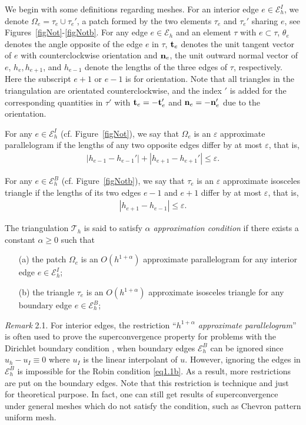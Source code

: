 \documentclass[leqno,final]{siamltex}
\numberwithin{equation}{section}
\newcommand{\abs}[1]{\left\vert#1\right\vert}
\newcommand{\al}{\alpha}
\newcommand{\ep}{\varepsilon}
\newcommand{\Om}{\Omega}
\newcommand{\ta}{\theta}
\newcommand{\bt}{{\rm\mathbf t}}
\newcommand{\bn}{{\rm\mathbf n}}
\newcommand{\T}{\mathcal{T}}
\newcommand{\E}{\mathcal{E}}
\newcommand{\eqn}[1]{\begin{align*}#1\end{align*}}
\begin{document}
We begin with some definitions regarding meshes.
For an interior edge $e\in\E_h^I$, we denote $\Om_e=\tau_e\cup\tau_e'$,
a patch formed by the two elements $\tau_e$ and $\tau_e'$ sharing $e$, see Figures~\ref{figNot}-\ref{figNotb}.
For any edge $e\in\E_h$ and an element $\tau$ {with} $e\subset\tau$,
$\ta_e$ denotes the angle opposite of the edge $e$ in $\tau${,
$\bt_e$ denotes the unit tangent vector of $e$ with counterclockwise orientation and $\bn_e$, the unit outward normal vector of $e$,
$h_e, h_{e+1}$, and $h_{e-1}$ denote the lengths of the three edges of $\tau$, respectively.
Here the subscript $e+1$ or $e-1$ is for orientation.
Note that all triangles in the triangulation are orientated counterclockwise,
and the} index $'$ is added for the corresponding quantities in $\tau'$ with $\bt_e=-\bt_e'$ and $\bn_e=-\bn_e'$
due to the orientation.

For any $e\in\E_h^I$ (cf. Figure~\ref{figNot}), we say that $\Om_e$ is an $\ep$ approximate parallelogram if the
lengths of any two opposite edges differ by at most $\ep$, that is,
\eqn{ \abs{h_{e-1}-h_{e-1}'} + \abs{h_{e+1}-h_{e+1}'}\le\ep. }

For any $e\in\E_h^B$ (cf. Figure~\ref{figNotb}), we say that $\tau_e$ is an $\ep$ approximate isosceles triangle if the lengths of
its two edges $e-1$ and $e+1$ differ by at most $\ep$, that is,
\eqn{ \abs{h_{e+1}-h_{e-1}}\le\ep. }


\begin{definition} \label{meshcond}
The triangulation $\T_h$ is said to satisfy \emph{$\al$ approximation condition} if there exists a constant $\al\geq0$
such that
\begin{itemize}
  \item[(a)] the patch $\Om_e$ is an $O(h^{1+\al})$ approximate parallelogram for any interior edge $e\in\E_h^I$;
  \item[(b)] the triangle $\tau_e$ is an $O(h^{1+\al})$ approximate isosceles triangle for any boundary edge $e\in\E_h^B$;
\end{itemize}
\end{definition}

\emph{Remark} 2.1.
For interior edges, the restriction ``\emph{$h^{1+\al}$ approximate parallelogram}'' is often used
 to prove the superconvergence property for problems with the Dirichlet boundary condition \cite{cx07,wz07},
 when boundary edges $\E_h^B$ can be ignored since $u_h-u_I\equiv0$ where
$u_I$ is the linear interpolant of $u$. However, ignoring the edges in $\E_h^B$ is impossible for the Robin condition
\eqref{eq1.1b}. As a result, more restrictions are put on the boundary edges.
Note that this restriction is technique and just for theoretical
purpose. In fact, one can still get results of superconvergence under general meshes which do not satisfy the condition, such as Chevron pattern uniform mesh.
\end{document}

